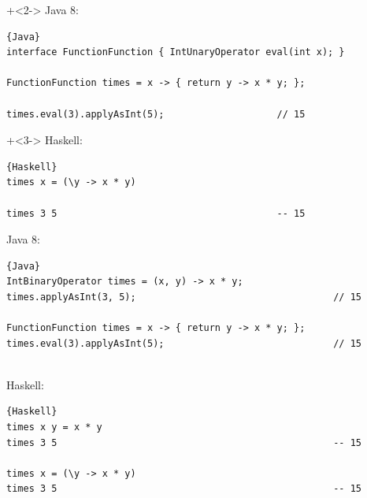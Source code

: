 \begin{frame}[fragile]{}
\onslide+<2->
Java 8:
\begin{lstlisting}{Java}
interface FunctionFunction { IntUnaryOperator eval(int x); }

FunctionFunction times = x -> { return y -> x * y; };

times.eval(3).applyAsInt(5);                    // 15
\end{lstlisting}

\onslide+<3->
Haskell:
\begin{lstlisting}{Haskell}
times x = (\y -> x * y)

times 3 5                                       -- 15
\end{lstlisting}

\end{frame}

\begin{frame}[fragile]{}
Java 8: 
\begin{lstlisting}{Java}
IntBinaryOperator times = (x, y) -> x * y;
times.applyAsInt(3, 5);                                   // 15

FunctionFunction times = x -> { return y -> x * y; };
times.eval(3).applyAsInt(5);                              // 15
\end{lstlisting}
~\\
Haskell: 
\begin{lstlisting}{Haskell}
times x y = x * y
times 3 5                                                 -- 15

times x = (\y -> x * y)
times 3 5                                                 -- 15
\end{lstlisting}

\end{frame}

